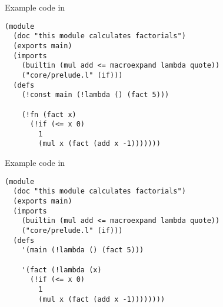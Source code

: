 

\begin{frame}[fragile]{Example code in \lang}

\begin{verbatim}
(module
  (doc "this module calculates factorials")
  (exports main)
  (imports
    (builtin (mul add <= macroexpand lambda quote))
    ("core/prelude.l" (if)))
  (defs
    (!const main (!lambda () (fact 5)))

    (!fn (fact x)
      (!if (<= x 0)
        1
        (mul x (fact (add x -1)))))))
\end{verbatim}
\end{frame}

\begin{frame}[fragile]{Example code in \lang}
\begin{verbatim}
(module
  (doc "this module calculates factorials")
  (exports main)
  (imports
    (builtin (mul add <= macroexpand lambda quote))
    ("core/prelude.l" (if)))
  (defs
    '(main (!lambda () (fact 5)))

    '(fact (!lambda (x)
      (!if (<= x 0)
        1
        (mul x (fact (add x -1))))))))
\end{verbatim}
\end{frame}


